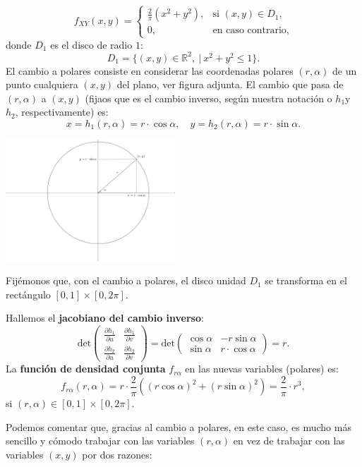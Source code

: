\documentclass[
  letterpaper,
  DIV=11,
  numbers=noendperiod]{scrreprt}
\begin{document}
\[
f_{XY}(x,y)=
\begin{cases}
\frac{2}{\pi}\left(x^2 + y^2\right), & \mbox{si }(x,y)\in D_1, \\
0, & \mbox{en caso contrario,}
\end{cases}
\] donde \(D_1\) es el disco de radio \(1\): \[
D_1 = \{(x,y)\in\mathbb{R}^2,\ | \ x^2+y^2\leq 1\}.
\] El cambio a polares consiste en considerar las coordenadas polares
\((r,\alpha)\) de un punto cualquiera \((x,y)\) del plano, ver figura
adjunta. El cambio que pasa de \((r,\alpha)\) a \((x,y)\) (fijaos que es
el cambio inverso, según nuestra notación o \(h_1\)y \(h_2\),
respectivamente) es: \[
x=h_1(r,\alpha)=r\cdot \cos\alpha,\quad y=h_2(r,\alpha)=r\cdot \sin\alpha.
\]

\includegraphics[width=2.5in,height=\textheight]{Images/Polares.png}

Fijémonos que, con el cambio a polares, el disco unidad \(D_1\) se
transforma en el rectángulo \([0,1]\times [0,2\pi]\).

Hallemos el \textbf{jacobiano del cambio inverso}: \[
\mathrm{det}\begin{pmatrix}\frac{\partial h_1}{\partial u} & \frac{\partial h_1}{\partial v}\\ \frac{\partial h_2}{\partial u} & \frac{\partial h_2}{\partial v}\end{pmatrix} =\mathrm{det}\begin{pmatrix}\cos\alpha & -r\sin\alpha\\ \sin\alpha & r\cdot\cos\alpha\end{pmatrix} = r.
\] La \textbf{función de densidad conjunta} \(f_{r\alpha}\) en las
nuevas variables (polares) es: \[
f_{r\alpha}(r,\alpha)=r\cdot \frac{2}{\pi}\left((r\cos\alpha)^2+(r\sin\alpha)^2\right)=\frac{2}{\pi}\cdot r^3,
\] si \((r,\alpha)\in [0,1]\times [0,2\pi]\).

Podemos comentar que, gracias al cambio a polares, en este caso, es
mucho más sencillo y cómodo trabajar con las variables \((r,\alpha)\) en
vez de trabajar con las variables \((x,y)\) por dos razones:
\end{document}
